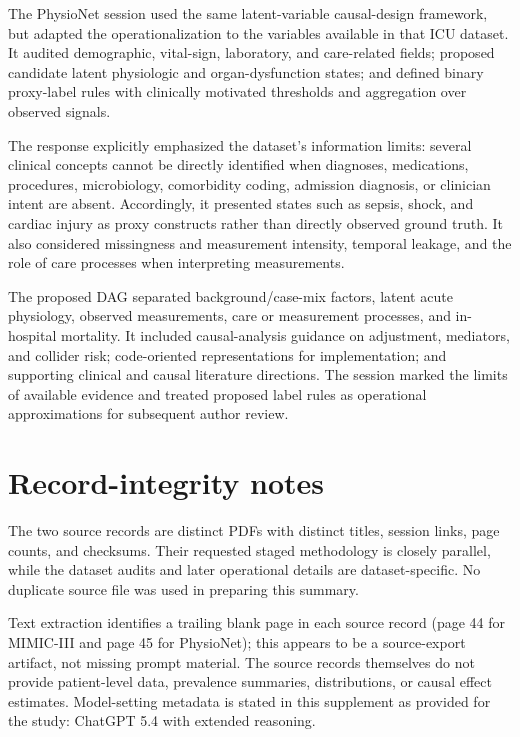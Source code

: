\documentclass[11pt,a4paper]{article}
\begin{document}
The PhysioNet session used the same latent-variable causal-design framework,
but adapted the operationalization to the variables available in that ICU
dataset. It audited demographic, vital-sign, laboratory, and care-related
fields; proposed candidate latent physiologic and organ-dysfunction states; and
defined binary proxy-label rules with clinically motivated thresholds and
aggregation over observed signals.

The response explicitly emphasized the dataset's information limits: several
clinical concepts cannot be directly identified when diagnoses, medications,
procedures, microbiology, comorbidity coding, admission diagnosis, or clinician
intent are absent. Accordingly, it presented states such as sepsis, shock, and
cardiac injury as proxy constructs rather than directly observed ground truth.
It also considered missingness and measurement intensity, temporal leakage,
and the role of care processes when interpreting measurements.

The proposed DAG separated background/case-mix factors, latent acute
physiology, observed measurements, care or measurement processes, and
in-hospital mortality. It included causal-analysis guidance on adjustment,
mediators, and collider risk; code-oriented representations for implementation;
and supporting clinical and causal literature directions. The session marked
the limits of available evidence and treated proposed label rules as
operational approximations for subsequent author review.

\section{Record-integrity notes}
The two source records are distinct PDFs with distinct titles, session links,
page counts, and checksums. Their requested staged methodology is closely
parallel, while the dataset audits and later operational details are
dataset-specific. No duplicate source file was used in preparing this summary.

Text extraction identifies a trailing blank page in each source record (page 44
for MIMIC-III and page 45 for PhysioNet); this appears to be a source-export
artifact, not missing prompt material. The source records themselves do not
provide patient-level data, prevalence summaries, distributions, or causal
effect estimates. Model-setting metadata is stated in this supplement as
provided for the study: ChatGPT 5.4 with extended reasoning.
\end{document}
